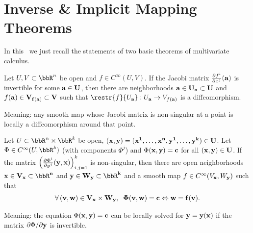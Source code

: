 \section{Inverse \& Implicit Mapping Theorems}

In this \sect\ we just recall the statements of two basic theorems of multivariate calculus.
\begin{thm}\label{InMT}
    Let $U,V\subset\bbR^n$ be open and $f\in C^\infty(U,V)$. If the Jacobi matrix $\frac{\partial f^i}{\partial x^j} (\bf{a})$ is invertible for some $\bf{a}\in U$, then there are neighborhoods $\bf{a}\in U_{\bf{a}}\subset U$ and $f(\bf{a})\in V_{f(\bf{a})}\subset V$ such that $\restr{f}{U_{\bf{a}}}:U_{\bf{a}}\to V_{f(\bf{a})}$ is a diffeomorphism.
\end{thm}
Meaning: any smooth map whose Jacobi matrix is non-singular at a point is locally a diffeomorphism around that point.

\begin{thm}\label{ImMT}
    Let $U\subset \bbR^n\times \bbR^k$ be open, $(\bf{x},\bf{y})=(x^1,\ldots,x^n,y^1,\ldots,y^k)\in U$. Let $\Phi\in C^\infty(U,\bbR^k)$ (with components $\Phi^j$) and $\Phi(\bf{x},\bf{y})=\bf{c}$ for all $(\bf{x},\bf{y})\in U$. If the matrix $\left(\frac{\partial\Phi^i}{\partial y^j}(\bf{y},\bf{x})\right)_{i,j=1}^k$  is non-singular, then there are open neighborhoods $\bf{x}\in V_{\bf{x}}\subset \bbR^n$ and $\bf{y}\in W_{\bf{y}}\subset\bbR^k$ and a smooth map $f\in C^\infty (V_{\bf{x}},W_{\bf{y}})$ such that 
\[\forall\,(\bf{v},\bf{w})\in V_{\bf{x}}\times W_{\bf{y}},\;\; \Phi (\bf{v},\bf{w})=\bf{c} \Leftrightarrow \bf{w}=f(\bf{v}).\]
\end{thm}
Meaning: the equation $\Phi(\bf{x},\bf{y})=\bf{c}$ can be locally solved for $\bf{y}=\bf{y}(\bf{x})$ if the matrix $\partial \Phi/\partial\bf{y}$ is invertible.

